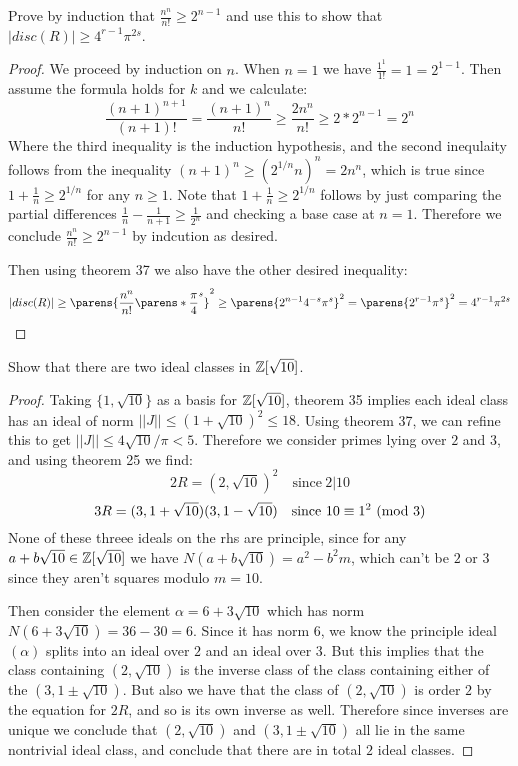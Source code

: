\documentclass[11pt]{article}
\begin{document}
Prove by induction that $\frac{n^n}{n!} \ge 2^{n-1}$ and use this to show that $|disc(R)| \ge 4^{r-1}\pi^{2s}$.
\begin{proof}
  We proceed by induction on $n$. When $n = 1$ we have $\frac{1^1}{1!} = 1 = 2^{1-1}$. Then assume the formula holds for $k$ and we calculate:
  \begin{equation*}
    \frac{(n+1)^{n+1}}{(n+1)!} = \frac{(n+1)^n}{n!} \ge \frac{2n^n}{n!} \ge 2*2^{n-1} = 2^n
  \end{equation*}
  Where the third inequality is the induction hypothesis, and the second inequlaity follows from the inequality $(n+1)^n \ge (2^{1/n}n)^n = 2n^n$, which is true since $1 + \frac{1}{n} \ge 2^{1/n}$ for any $n \ge 1$. Note that $1 + \frac{1}{n} \ge 2^{1/n}$ follows by just comparing the partial differences $\frac{1}{n} - \frac{1}{n+1} \ge \frac{1}{2^n}$ and checking a base case at $n=1$. Therefore we conclude $\frac{n^n}{n!} \ge 2^{n-1}$ by indcution as desired.

  Then using theorem 37 we also have the other desired inequality:
  \begin{equation*}
    |disc(R)| \ge \parens{\frac{n^n}{n!}\parens*{\frac{\pi}{4}}^s}^2 \ge \parens{2^{n-1}4^{-s}\pi^s}^2 = \parens{2^{r-1}\pi^s}^2 = 4^{r-1}\pi^{2s}
  \end{equation*}
\end{proof}


Show that there are two ideal classes in $\mathbb{Z}[\sqrt{10}]$.
\begin{proof}
  Taking $\{1,\sqrt{10}\}$ as a basis for $\mathbb{Z}[\sqrt{10}]$, theorem 35 implies each ideal class has an ideal of norm $||J|| \le (1 + \sqrt{10})^2 \le 18$. Using theorem 37, we can refine this to get $||J|| \le 4\sqrt{10}/\pi < 5$. Therefore we consider primes lying over $2$ and $3$, and using theorem 25 we find:
  $$2R = (2, \sqrt{10})^2 \quad \text{since}\ 2 | 10$$
  $$3R = (3, 1+\sqrt{10})(3, 1-\sqrt{10}) \quad \text{since}\ 10 \equiv 1^2\ (\text{mod}\ 3) $$
  None of these threee ideals on the rhs are principle, since for any $a + b\sqrt{10} \in \mathbb{Z}[\sqrt{10}]$ we have $N(a + b\sqrt{10}) = a^2 - b^2m$, which can't be $2$ or $3$ since they aren't squares modulo $m = 10$.

  Then consider the element $\alpha = 6 + 3\sqrt{10}$ which has norm $N(6 + 3\sqrt{10}) = 36 - 30 = 6$. Since it has norm $6$, we know the principle ideal $(\alpha)$ splits into an ideal over $2$ and an ideal over $3$. But this implies that the class containing $(2, \sqrt{10})$ is the inverse class of the class containing either of the $(3, 1 \pm \sqrt{10})$. But also we have that the class of $(2, \sqrt{10})$ is order $2$ by the equation for $2R$, and so is its own inverse as well. Therefore since inverses are unique we conclude that $(2, \sqrt{10})$ and $(3, 1 \pm \sqrt{10})$ all lie in the same nontrivial ideal class, and conclude that there are in total $2$ ideal classes.
\end{proof}
\end{document}
